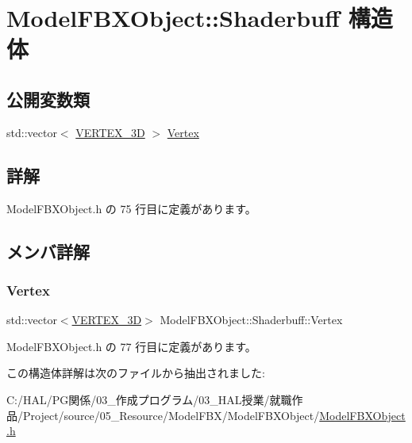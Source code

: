 \hypertarget{struct_model_f_b_x_object_1_1_shaderbuff}{}\section{Model\+F\+B\+X\+Object\+:\+:Shaderbuff 構造体}
\label{struct_model_f_b_x_object_1_1_shaderbuff}
\subsection*{公開変数類}
\begin{DoxyCompactItemize}
\item 
std\+::vector$<$ \mbox{\hyperlink{struct_model_f_b_x_object_1_1_v_e_r_t_e_x__3_d}{V\+E\+R\+T\+E\+X\+\_\+3D}} $>$ \mbox{\hyperlink{struct_model_f_b_x_object_1_1_shaderbuff_a565777c2bc32ae26ee9374cc1b36fd48}{Vertex}}
\end{DoxyCompactItemize}


\subsection{詳解}


 Model\+F\+B\+X\+Object.\+h の 75 行目に定義があります。



\subsection{メンバ詳解}
\mbox{\label{struct_model_f_b_x_object_1_1_shaderbuff_a565777c2bc32ae26ee9374cc1b36fd48}} 
\subsubsection{\texorpdfstring{Vertex}{Vertex}}
{\footnotesize\ttfamily std\+::vector$<$\mbox{\hyperlink{struct_model_f_b_x_object_1_1_v_e_r_t_e_x__3_d}{V\+E\+R\+T\+E\+X\+\_\+3D}}$>$ Model\+F\+B\+X\+Object\+::\+Shaderbuff\+::\+Vertex}



 Model\+F\+B\+X\+Object.\+h の 77 行目に定義があります。



この構造体詳解は次のファイルから抽出されました\+:\begin{DoxyCompactItemize}
\item 
C\+:/\+H\+A\+L/\+P\+G関係/03\+\_\+作成プログラム/03\+\_\+\+H\+A\+L授業/就職作品/\+Project/source/05\+\_\+\+Resource/\+Model\+F\+B\+X/\+Model\+F\+B\+X\+Object/\mbox{\hyperlink{_model_f_b_x_object_8h}{Model\+F\+B\+X\+Object.\+h}}\end{DoxyCompactItemize}
